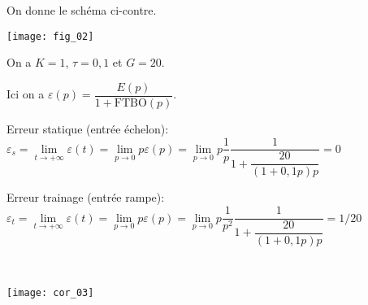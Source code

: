 On donne le schéma ci-contre.

\begin{marginfigure}
\texttt{[image: fig\_02]}
\end{marginfigure}
On a $K=1$, $\tau = 0,1$ et $G=20$. 
\fi


%
%
%
%


\ifprof
\begin{corrige}
Ici on a $\varepsilon(p)=\dfrac{E(p)}{1+{\text{FTBO}}(p)}$. 

Erreur statique (entrée échelon): $\varepsilon_s 
= \lim\limits_{t\to +\infty} \varepsilon(t)
= \lim\limits_{p\to 0} p\varepsilon(p)
= \lim\limits_{p\to 0} p \dfrac{1}{p}\dfrac{1}{1+\dfrac{20}{(1+0,1p)p}}=0$

Erreur trainage (entrée rampe): $\varepsilon_t
= \lim\limits_{t\to +\infty} \varepsilon(t)
= \lim\limits_{p\to 0} p\varepsilon(p)
= \lim\limits_{p\to 0} p \dfrac{1}{p^2}\dfrac{1}{1+\dfrac{20}{(1+0,1p)p}}=1/20$
\end{corrige}
\else
\fi


\ifprof
\begin{corrige}~\\


\begin{center}
\texttt{[image: cor\_03]}
\end{center}
\end{corrige}
\else
\fi


